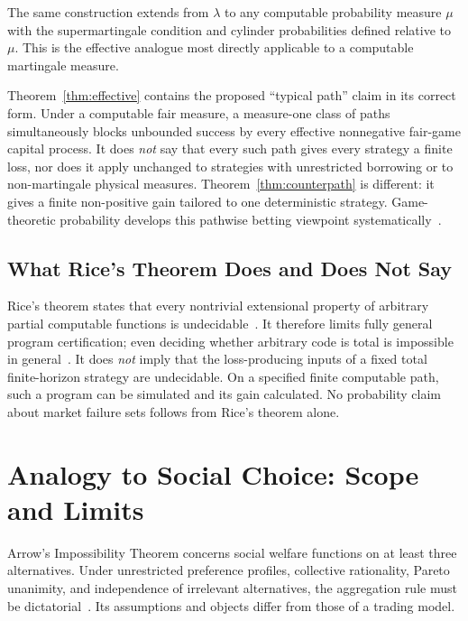 \documentclass[aps,pra,reprint,superscriptaddress,amsmath,amssymb,floatfix]{revtex4-2}
\theoremstyle{plain}
\theoremstyle{definition}
\theoremstyle{remark}
\begin{document}
The same construction extends from \(\lambda\) to any computable probability
measure \(\mu\) with the supermartingale condition and cylinder probabilities
defined relative to \(\mu\). This is the effective analogue most directly
applicable to a computable martingale measure.

Theorem~\ref{thm:effective} contains the proposed ``typical path'' claim in its
correct form. Under a computable fair measure, a measure-one class of paths
simultaneously blocks unbounded success by every effective nonnegative
fair-game capital process. It does \emph{not} say that every such path gives
every strategy a finite loss, nor does it apply unchanged to strategies with
unrestricted borrowing or to non-martingale physical measures.
Theorem~\ref{thm:counterpath} is different: it gives a finite non-positive gain
tailored to one deterministic strategy. Game-theoretic probability develops
this pathwise betting viewpoint systematically~\cite{ShaferVovk2001}.

\subsection{What Rice's Theorem Does and Does Not Say}

Rice's theorem states that every nontrivial extensional property of arbitrary
partial computable functions is undecidable~\cite{Rice-1953}. It therefore
limits fully general program certification; even deciding whether arbitrary
code is total is impossible in general~\cite{turing-36}. It does \emph{not}
imply that the loss-producing inputs of a fixed total finite-horizon strategy
are undecidable. On a specified finite computable path, such a program can be
simulated and its gain calculated. No probability claim about market failure
sets follows from Rice's theorem alone.

\section{Analogy to Social Choice: Scope and Limits}
\label{sec:arrow}

Arrow's Impossibility Theorem concerns social welfare functions on at least
three alternatives. Under unrestricted preference profiles, collective
rationality, Pareto unanimity, and independence of irrelevant alternatives,
the aggregation rule must be dictatorial~\cite{Arrow1963}. Its assumptions and
objects differ from those of a trading model.
\end{document}
